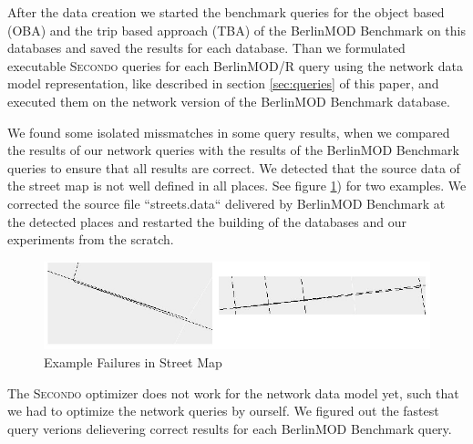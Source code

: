 \documentclass[a4paper]{article}
\newcommand{\secondo}{\textsc{Secondo}}
\newcommand{\bmodb} {BerlinMOD Benchmark}
\begin{document}
After the data creation we started the benchmark queries for
the object based (OBA) and the trip based approach (TBA) of the \bmodb{} on this
databases and saved the results for each database. Than we formulated executable
\secondo{} queries for each BerlinMOD/R query using the network data model
representation, like described in section \ref{sec:queries} of this paper, and
executed them on the network version of the \bmodb{} database.

We found some isolated missmatches in some query results, when we compared the
results of our network queries with the results of the \bmodb{}
queries to ensure that all results are correct. We detected that the source
data of the street map is not well defined in all places. See figure
\ref{fig:routefailure}) for two examples. We corrected the source file
``streets.data`` delivered by \bmodb{} at the detected places and restarted the
building of the databases and our experiments from the scratch.
\begin{figure}
\begin{center}
   \includegraphics[scale=1.0]{routefailure.eps}
   \caption{Example Failures in Street Map}
   \label{fig:routefailure}
   \end{center}
\end{figure}

The \secondo{} optimizer does not work for the network data model yet, such that
we had to optimize the network queries by ourself. We figured out the fastest
query verions delievering correct results for each \bmodb{} query.
\end{document}
